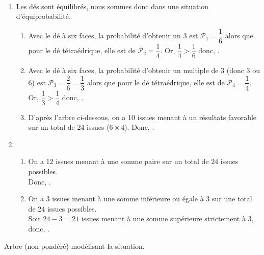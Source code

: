 \ \\ [-5mm]
\begin{enumerate}
   \item Les dés sont équilibrés, nous sommes donc dans une situation d'équiprobabilité. \\
   \begin{enumerate}
      \item Avec le dé à six faces, la probabilité d'obtenir un 3 est $\mathcal{P}_1 =\dfrac16$ alors que pour le dé tétraédrique, elle est de $\mathcal{P}_2=\dfrac14$. Or, $\dfrac14>\dfrac16$ donc, .
      \item Avec le dé à six faces, la probabilité d'obtenir un multiple de 3 (donc 3 ou 6) est $\mathcal{P}_3 =\dfrac26 =\dfrac13$ alors que pour le dé tétraédrique, elle est de $\mathcal{P}_4 =\dfrac14$. Or, $\dfrac13>\dfrac14$ donc, .
      \item D'après l'arbre ci-dessous, on a 10 issues menant à un résultats favorable sur un total de 24 issues ($6\times4$). Donc, .
   \end{enumerate}
   \smallskip
   \item
   \begin{enumerate}
      \item On a 12 issues menant à une somme paire sur un total de 24 issues possibles. \\
      Donc, .
      \smallskip
      \item On a 3 issues menant à une somme inférieure ou égale à 3 sur une total de 24 issues possibles. \\
      Soit $24-3 =21$ issues menant à une somme supérieure strictement à 3, donc, . \\
   \end{enumerate}
\end{enumerate}
\bigskip
Arbre (non pondéré) modélisant la situation. \\
\bigskip
\hspace*{2.5cm}
